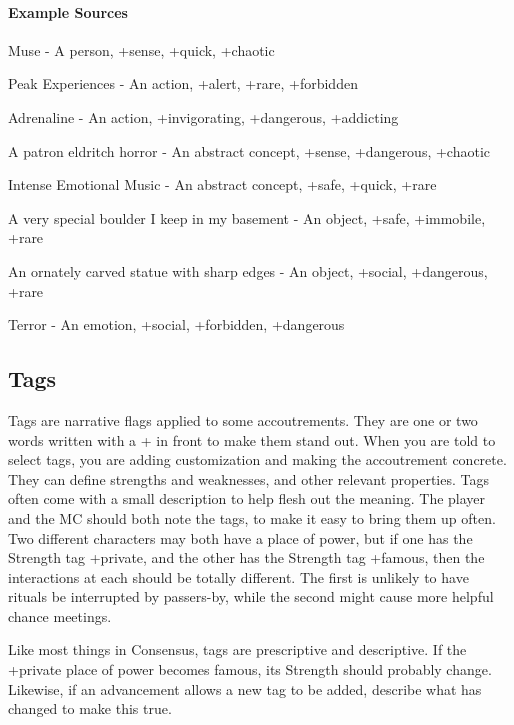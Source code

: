 \documentclass[
  oneside,
  statementpaper,
  9pt]{memoir}
\begin{document}
\hypertarget{example-sources}{%
\paragraph{Example Sources}\label{example-sources}}

\begin{Player}

Muse - A person, +sense, +quick, +chaotic

Peak Experiences - An action, +alert, +rare, +forbidden

Adrenaline - An action, +invigorating, +dangerous, +addicting

A patron eldritch horror - An abstract concept, +sense, +dangerous, +chaotic

Intense Emotional Music - An abstract concept, +safe, +quick, +rare

A very special boulder I keep in my basement - An object, +safe, +immobile, +rare

An ornately carved statue with sharp edges - An object, +social, +dangerous, +rare

Terror - An emotion, +social, +forbidden, +dangerous

\end{Player}

\hypertarget{tags}{%
\subsection{Tags}\label{tags}}

\begin{Player}

Tags are narrative flags applied to some accoutrements. They are one or two words written with a + in front to make them stand out. When you are told to select tags, you are adding customization and making the accoutrement concrete. They can define strengths and weaknesses, and other relevant properties. Tags often come with a small description to help flesh out the meaning. The player and the MC should both note the tags, to make it easy to bring them up often. Two different characters may both have a place of power, but if one has the Strength tag +private, and the other has the Strength tag +famous, then the interactions at each should be totally different. The first is unlikely to have rituals be interrupted by passers-by, while the second might cause more helpful chance meetings.

Like most things in Consensus, tags are prescriptive and descriptive. If the +private place of power becomes famous, its Strength should probably change. Likewise, if an advancement allows a new tag to be added, describe what has changed to make this true.

\end{Player}
\end{document}
